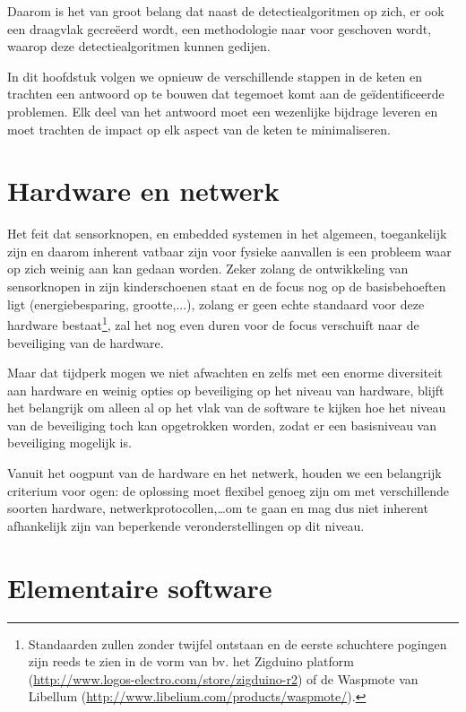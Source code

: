 Daarom is het van groot belang dat naast de detectiealgoritmen op zich, er ook
een draagvlak gecre\"eerd wordt, een methodologie naar voor geschoven wordt,
waarop deze detectiealgoritmen kunnen gedijen.

In dit hoofdstuk volgen we opnieuw de verschillende stappen in de keten en
trachten een antwoord op te bouwen dat tegemoet komt aan de ge\"identificeerde
problemen. Elk deel van het antwoord moet een wezenlijke bijdrage leveren en
moet trachten de impact op elk aspect van de keten te minimaliseren.

\section{Hardware en netwerk}
\label{section:solution-node-wsn}

Het feit dat sensorknopen, en embedded systemen in het algemeen, toegankelijk
zijn en daarom inherent vatbaar zijn voor fysieke aanvallen is een probleem
waar op zich weinig aan kan gedaan worden. Zeker zolang de ontwikkeling van
sensorknopen in zijn kinderschoenen staat en de focus nog op de basisbehoeften
ligt (energiebesparing, grootte,...), zolang er geen echte standaard voor deze
hardware bestaat\footnote{Standaarden zullen zonder twijfel ontstaan en de
eerste schuchtere pogingen zijn reeds te zien in de vorm van bv. het Zigduino
platform (\url{http://www.logos-electro.com/store/zigduino-r2}) of de Waspmote
van Libellum (\url{http://www.libelium.com/products/waspmote/}).}, zal het nog
even duren voor de focus verschuift naar de beveiliging van de hardware.

Maar dat tijdperk mogen we niet afwachten en zelfs met een enorme diversiteit
aan hardware en weinig opties op beveiliging op het niveau van hardware, blijft
het belangrijk om alleen al op het vlak van de software te kijken hoe het
niveau van de beveiliging toch kan opgetrokken worden, zodat er een basisniveau
van beveiliging mogelijk is.

Vanuit het oogpunt van de hardware en het netwerk, houden we een belangrijk
criterium voor ogen: de oplossing moet flexibel genoeg zijn om met
verschillende soorten hardware, netwerkprotocollen,\dots om te gaan en mag dus
niet inherent afhankelijk zijn van beperkende veronderstellingen op dit niveau.

\section{Elementaire software}
\label{section:solution-software}

